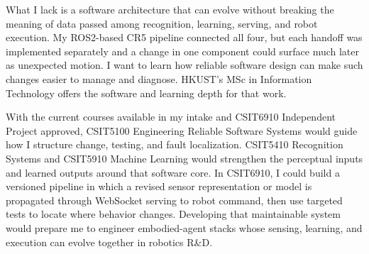 What I lack is a software architecture that can evolve without breaking the meaning of data passed among recognition, learning, serving, and robot execution. My ROS2-based CR5 pipeline connected all four, but each handoff was implemented separately and a change in one component could surface much later as unexpected motion. I want to learn how reliable software design can make such changes easier to manage and diagnose. HKUST's MSc in Information Technology offers the software and learning depth for that work.

With the current courses available in my intake and CSIT6910 Independent Project approved, CSIT5100 Engineering Reliable Software Systems would guide how I structure change, testing, and fault localization. CSIT5410 Recognition Systems and CSIT5910 Machine Learning would strengthen the perceptual inputs and learned outputs around that software core. In CSIT6910, I could build a versioned pipeline in which a revised sensor representation or model is propagated through WebSocket serving to robot command, then use targeted tests to locate where behavior changes. Developing that maintainable system would prepare me to engineer embodied-agent stacks whose sensing, learning, and execution can evolve together in robotics R\&D.
